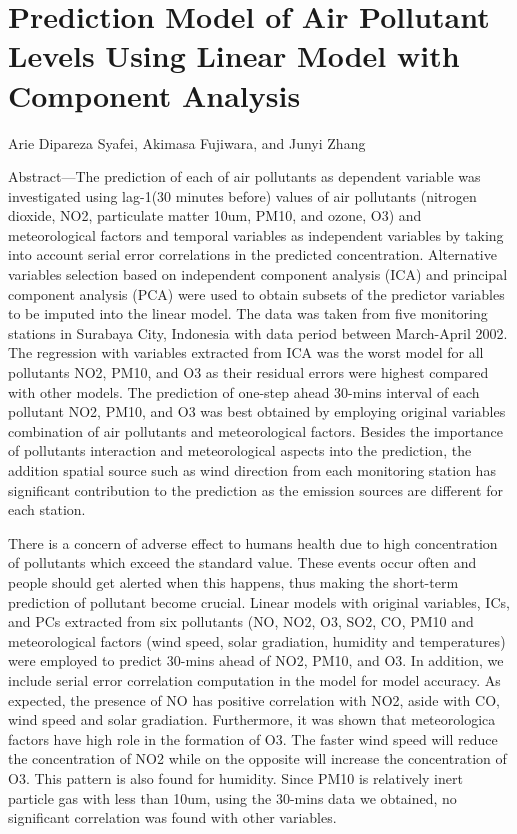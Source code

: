 \section{Prediction Model of Air Pollutant Levels Using Linear Model with Component Analysis}

Arie Dipareza Syafei, Akimasa Fujiwara, and Junyi Zhang

Abstract—The prediction of each of air pollutants as
dependent variable was investigated using lag-1(30 minutes
before) values of air pollutants (nitrogen dioxide, NO2,
particulate matter 10um, PM10, and ozone, O3) and
meteorological factors and temporal variables as independent
variables by taking into account serial error correlations in the
predicted concentration. Alternative variables selection based
on independent component analysis (ICA) and principal
component analysis (PCA) were used to obtain subsets of the
predictor variables to be imputed into the linear model. The
data was taken from five monitoring stations in Surabaya City,
Indonesia with data period between March-April 2002. The
regression with variables extracted from ICA was the worst
model for all pollutants NO2, PM10, and O3 as their residual
errors were highest compared with other models. The
prediction of one-step ahead 30-mins interval of each pollutant
NO2, PM10, and O3 was best obtained by employing original
variables combination of air pollutants and meteorological
factors. Besides the importance of pollutants interaction and
meteorological aspects into the prediction, the addition spatial
source such as wind direction from each monitoring station has
significant contribution to the prediction as the emission
sources are different for each station.

There is a concern of adverse effect to humans health due
to high concentration of pollutants which exceed the standard
value. These events occur often and people should get alerted
when this happens, thus making the short-term prediction of
pollutant become crucial. Linear models with original
variables, ICs, and PCs extracted from six pollutants (NO,
NO2, O3, SO2, CO, PM10 and meteorological factors (wind
speed, solar gradiation, humidity and temperatures) were
employed to predict 30-mins ahead of NO2, PM10, and O3. In
addition, we include serial error correlation computation in
the model for model accuracy. As expected, the presence of
NO has positive correlation with NO2, aside with CO, wind
speed and solar gradiation. Furthermore, it was shown that
meteorologica factors have high role in the formation of O3.
The faster wind speed will reduce the concentration of NO2
while on the opposite will increase the concentration of O3.
This pattern is also found for humidity. Since PM10 is
relatively inert particle gas with less than 10um, using the
30-mins data we obtained, no significant correlation was
found with other variables.


